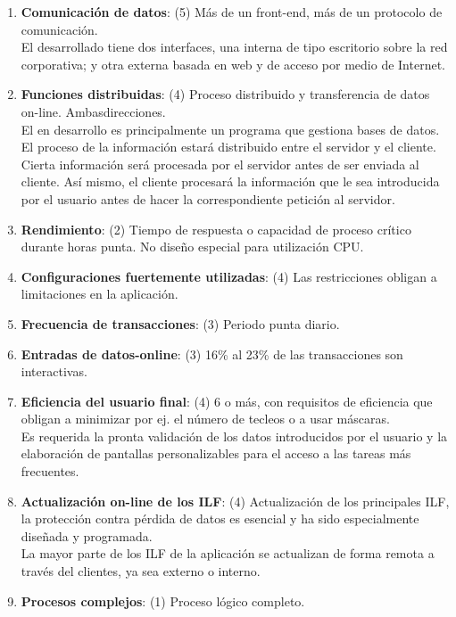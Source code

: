 \documentclass[11pt, a4paper, twoside, titlepage]{article}
\begin{document}
				\begin{enumerate}
					\item \textbf{Comunicación de datos}: (5) Más de un front-end, más de un protocolo de comunicación.\\
						El \software desarrollado tiene dos interfaces, una interna de tipo escritorio sobre la red corporativa; y otra externa basada en web y de acceso por medio de Internet.

					\item \textbf{Funciones distribuidas}: (4) Proceso distribuido y transferencia de datos on-line. Ambas\break direcciones.\\
						El \software en desarrollo es principalmente un programa que gestiona bases de datos. El proceso de la información estará distribuido entre el servidor y el cliente. Cierta información será procesada por el servidor antes de ser enviada al cliente. Así mismo, el cliente procesará la información que le sea introducida por el usuario antes de hacer la correspondiente petición al servidor.

					\item \textbf{Rendimiento}: (2) Tiempo de respuesta o capacidad de proceso crítico durante horas punta. No diseño especial para utilización CPU.
	
					\item \textbf{Configuraciones fuertemente utilizadas}: (4) Las restricciones obligan a limitaciones en la aplicación.
					\item \textbf{Frecuencia de transacciones}: (3) Periodo punta diario.
					\item \textbf{Entradas de datos-online}: (3) 16\% al 23\% de las transacciones son interactivas.
					\item \textbf{Eficiencia del usuario final}: (4) 6 o más, con requisitos de eficiencia que obligan a minimizar por ej. el número de tecleos o a usar máscaras.\\
						Es requerida la pronta validación de los datos introducidos por el usuario y la elaboración de pantallas personalizables para el acceso a las tareas más frecuentes.
					\item \textbf{Actualización on-line de los ILF}: (4) Actualización de los principales ILF, la protección contra pérdida de datos es esencial y ha sido especialmente diseñada y programada.\\
						La mayor parte de los ILF de la aplicación se actualizan de forma remota a través del \software clientes, ya sea externo o interno.
					\item \textbf{Procesos complejos}: (1) Proceso lógico completo.


\end{enumerate}
\end{document}

